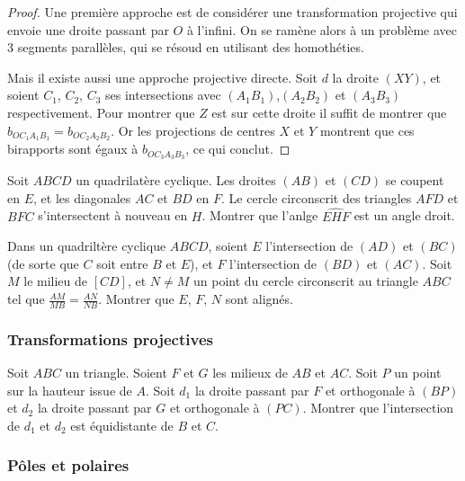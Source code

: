 \begin{proof}
Une première approche est de considérer une transformation projective qui envoie une droite passant par $O$ à l'infini. On se ramène alors à un problème avec $3$ segments parallèles, qui se résoud en utilisant des homothéties.

\medskip

Mais il existe aussi une approche projective directe. Soit $d$ la droite $(XY)$, et soient $C_1$, $C_2$, $C_3$ ses intersections avec $(A_1B_1)$,$(A_2B_2)$ et $(A_3B_3)$ respectivement. Pour montrer que $Z$ est sur cette droite il suffit de montrer que $b_{OC_1A_1B_1} = b_{OC_2A_2B_2}$. Or les projections de centres $X$ et $Y$ montrent que ces birapports sont égaux à $b_{OC_3A_3B_3}$, ce qui conclut.
\end{proof}


\begin{exo}%
Soit $ABCD$ un quadrilatère cyclique. Les droites $(AB)$ et $(CD)$ se coupent en $E$, et les diagonales $AC$ et $BD$ en $F$. Le cercle circonscrit des triangles $AFD$ et $BFC$ s'intersectent à nouveau en $H$. Montrer que l'anlge $\widehat{EHF}$ est un angle droit.
\end{exo}


\begin{exo}
Dans un quadriltère cyclique $ABCD$, soient $E$ l'intersection de $(AD)$ et $(BC)$ (de sorte que $C$ soit entre $B$ et $E$), et $F$ l'intersection de $(BD)$ et $(AC)$. Soit $M$ le milieu de $[CD]$, et $N \ne M$ un point du cercle circonscrit au triangle $ABC$ tel que $\frac{AM}{MB} = \frac{AN}{NB}$. Montrer que $E$, $F$, $N$ sont alignés.
\end{exo}


\subsubsection{Transformations projectives}


\begin{exo}
Soit $ABC$ un triangle. Soient $F$ et $G$ les milieux de $AB$ et $AC$. Soit $P$ un point sur la hauteur issue de $A$. Soit $d_1$ la droite passant par $F$ et orthogonale à $(BP)$ et $d_2$ la droite passant par $G$ et orthogonale à $(PC)$. Montrer que l'intersection de $d_1$ et $d_2$ est équidistante de $B$ et $C$.
\end{exo}


\subsubsection{Pôles et polaires}


